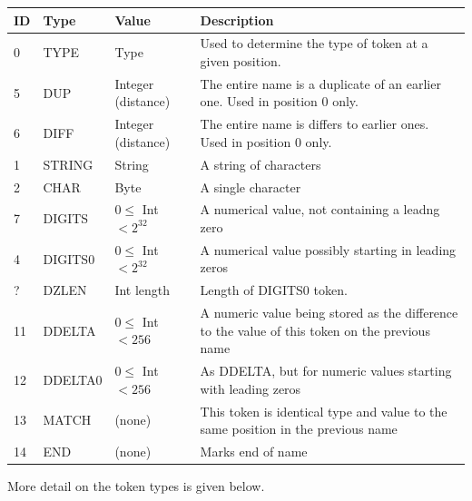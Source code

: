 \documentclass[a4paper]{article}
\begin{document}
\begin{tabular}{lllp{10cm}}
\hline
\textbf{ID} & \textbf{Type} & \textbf{Value} & \textbf{Description}\\
\hline
 0 & TYPE    & Type    & Used to determine the type of token at a given position. \\
\hline
 5 & DUP     & Integer (distance) & The entire name is a duplicate of an earlier one.  Used in position 0 only.\\
 6 & DIFF    & Integer (distance) & The entire name is differs to earlier ones.  Used in position 0 only.\\
\hline
 1 & STRING  & String  & A string of characters \\
 2 & CHAR    & Byte    & A single character \\
 7 & DIGITS  & $0 \le$ Int $< 2^{32}$ & A numerical value, not containing a leadng zero \\
 4 & DIGITS0 & $0 \le$ Int $< 2^{32}$ & A numerical value possibly starting in leading zeros \\
 ? & DZLEN   & Int length & Length of DIGITS0 token.\\
11 & DDELTA  & $0 \le$ Int $< 256$   & A numeric value being stored as the difference to the value of this token on the previous name \\
12 & DDELTA0 & $0 \le$ Int $< 256$ & As DDELTA, but for numeric values starting with leading zeros \\
13 & MATCH   & (none) & This token is identical type and value to the same position in the previous name \\
14 & END     & (none) & Marks end of name\\
\hline
\end{tabular}

More detail on the token types is given below.
\end{document}
